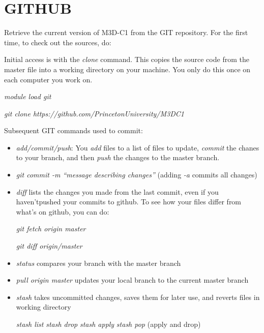 \section{GITHUB}
Retrieve the current version of M3D-C1 from the GIT repository.
For the first time, to check out the sources, do:

Initial access is with the {\it clone} command.   This copies the source
code from the master file into a working directory on your machine.
You only do this once on each computer you work on.

{\it module load git}

{\it git clone https://github.com/PrincetonUniversity/M3DC1}

Subsequent GIT commands used to commit:
\begin{itemize}

\item {\it add/commit/push}:  You {\it add} files to a list of
files to update,
{\it commit} the chanes to your branch, and then {\it push}
the changes to the master branch.

\item {\it git commit -m ``message describing changes'' }
    (adding {\it -a} commits all changes)

\item {\it diff} lists the changes you made from the last commit,
    even if you haven'tpushed your commits to github.
    To see how your files differ from what's on github,
    you can do:

    \hspace{3 cm} {\it git fetch origin master}

    \hspace{3 cm} {\it git diff origin/master}

\item {\it status} compares your branch with the master branch

\item {\it pull origin master} updates your local branch to the
  current master branch

\item {\it stash} takes uncommitted changes, saves them for later use, and
  reverts files in working directory

  \hspace{2 cm} {\it stash list} \hspace{0.5 cm} {\it stash drop} \hspace{0.5 cm}
         {\it stash apply} \hspace{0.5 cm} {\it stash pop} (apply and drop)


\end{itemize}
